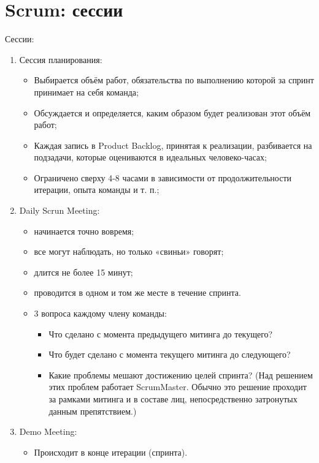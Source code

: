 \documentclass{article}
\begin{document}
\section{Scrum: сессии}
    Сессии:
    \begin{enumerate}
        \item Сессия планирования:
        \begin{itemize}
            \item Выбирается объём работ, обязательства по выполнению которой за спринт принимает на себя команда;
            \item Обсуждается и определяется, каким образом будет реализован этот объём работ;
            \item Каждая запись в Product Backlog, принятая к реализации, разбивается на подзадачи, которые оцениваются в идеальных человеко-часах;
            \item Ограничено сверху 4-8 часами в зависимости от продолжительности итерации, опыта команды и т. п.;
        \end{itemize}
        \item Daily Scrun Meeting:
        \begin{itemize}
            \item начинается точно вовремя;
            \item все могут наблюдать, но только «свиньи» говорят;
            \item длится не более 15 минут;
            \item проводится в одном и том же месте в течение спринта.
            \item 3 вопроса  каждому члену команды:
            \begin{itemize}
                \item Что сделано с момента предыдущего митинга до текущего?
                \item Что будет сделано с момента текущего митинга до следующего?
                \item Какие проблемы мешают достижению целей спринта? (Над решением этих проблем работает ScrumMaster. Обычно это решение проходит за рамками митинга и в составе лиц, непосредственно затронутых данным препятствием.)
            \end{itemize}
        \end{itemize}
        \item Demo Meeting:
        \begin{itemize}
            \item Происходит в конце итерации (спринта).

\end{itemize}
\end{enumerate}
\end{document}
